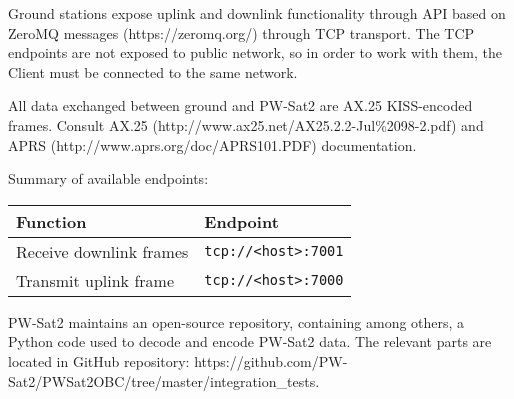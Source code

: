 Ground stations expose uplink and downlink functionality through API based on ZeroMQ messages (https://zeromq.org/) through TCP transport. The TCP endpoints are not exposed to public network, so in order to work with them, the Client must be connected to the same network.

All data exchanged between ground and PW-Sat2 are AX.25 KISS-encoded frames.  Consult AX.25 (http://www.ax25.net/AX25.2.2-Jul\%2098-2.pdf) and APRS (http://www.aprs.org/doc/APRS101.PDF) documentation.

Summary of available endpoints:
\begin{longtable}{l|l}
    \toprule
    \textbf{Function} & \textbf{Endpoint} \\
    \midrule
    \endhead
    Receive downlink frames & \texttt{tcp://<host>:7001} \\
    Transmit uplink frame & \texttt{tcp://<host>:7000} \\
    \bottomrule
\end{longtable}

PW-Sat2 maintains an open-source repository, containing among others, a Python code used to decode and encode PW-Sat2 data. The relevant parts are located in GitHub repository: https://github.com/PW-Sat2/PWSat2OBC/tree/master/integration_tests.